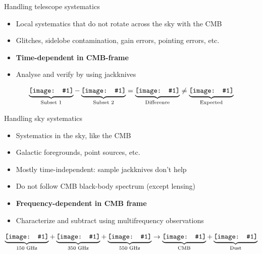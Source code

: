 \documentclass{beamer}
\newcommand*{\mimg}[2]{\begingroup
\setbox0=\hbox{\texttt{[image: \#1]}}\parbox{\wd0}{\box0}\endgroup}
\begin{document}
\begin{frame}{Handling telescope systematics}
	\begin{itemize}
		\item Local systematics that do not rotate across the sky with the CMB
		\item Glitches, sidelobe contamination, gain errors, pointing errors, etc.
		\item {\bf Time-dependent in CMB-frame}
		\item Analyse and verify by using jackknives
	\end{itemize}
	\[
		\underbrace{\mimg{out_dirty/null1_0.png}{2.0cm}}_{\textrm{Subset 1}} -
		\underbrace{\mimg{out_dirty/null1_1.png}{2.0cm}}_{\textrm{Subset 2}} =
		\underbrace{\mimg{out_dirty/null1_2.png}{2.0cm}}_{\textrm{Difference}} \ne
		\underbrace{\mimg{out_dirty/null1_3.png}{2.0cm}}_{\textrm{Expected}}
	\]
\end{frame}

\begin{frame}{Handling sky systematics}
	\begin{itemize}
		\item Systematics in the sky, like the CMB
		\item Galactic foregrounds, point sources, etc.
		\item Mostly time-independent: sample jackknives don't help
		\item Do not follow CMB black-body spectrum (except lensing)
		\item {\bf Frequency-dependent in CMB frame}
		\item Characterize and subtract using multifrequency observations
	\end{itemize}
	\[
		\underbrace{\mimg{out_dirty/null2_0.png}{1.8cm}}_{\textrm{150 GHz}} +
		\underbrace{\mimg{out_dirty/null2_1.png}{1.8cm}}_{\textrm{350 GHz}} +
		\underbrace{\mimg{out_dirty/null2_2.png}{1.8cm}}_{\textrm{550 GHz}} \rightarrow
		\underbrace{\mimg{out_dirty/null2_3.png}{1.8cm}}_{\textrm{CMB}} +
		\underbrace{\mimg{out_dirty/null2_4.png}{1.8cm}}_{\textrm{Dust}}
	\]
\end{frame}
\end{document}
